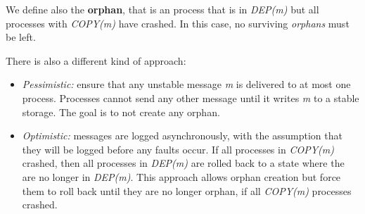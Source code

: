 We define also the \textbf{orphan}, that is an process that is in
\emph{DEP(m)} but all processes with \emph{COPY(m)} have crashed. In
this case, no surviving \emph{orphans} must be left.

There is also a different kind of approach:

\begin{itemize}
\itemsep1pt\parskip0pt
\item
  \emph{Pessimistic:} ensure that any unstable message \emph{m} is
  delivered to at most one process. Processes cannot send any other
  message until it writes \emph{m} to a stable storage. The goal is to
  not create any orphan.
\item
  \emph{Optimistic:} messages are logged asynchronously, with the
  assumption that they will be logged before any faults occur. If all
  processes in \emph{COPY(m)} crashed, then all processes in
  \emph{DEP(m)} are rolled back to a state where the are no longer in
  \emph{DEP(m)}. This approach allows orphan creation but force them to
  roll back until they are no longer orphan, if all \emph{COPY(m)}
  processes crashed.
\end{itemize}
